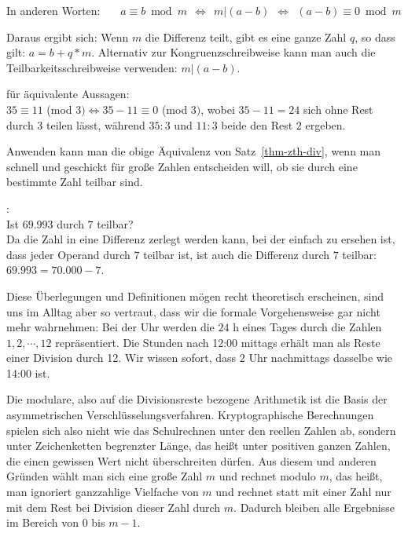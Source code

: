 \begin{refsegment}
\noindent In anderen Worten:~~~
$ a \equiv b \bmod{m}   ~~ \Longleftrightarrow ~~
  m | (a-b)             ~~ \Longleftrightarrow ~~
  (a-b) \equiv 0 \bmod{m} $


Daraus ergibt sich: Wenn $m$ die Differenz teilt, gibt es eine ganze Zahl $q$, so
dass gilt: $a = b + q*m$.
Alternativ zur Kongruenzschreibweise kann man auch die Teilbarkeitsschreibweise
verwenden: $m | (a - b)$.\\

\begin{example}{ für äquivalente Aussagen:}\\
$35 \equiv 11$ (mod $3) \Longleftrightarrow  35 - 11 \equiv 0$ (mod $3)$,
wobei $35 - 11 = 24$ sich ohne Rest durch $3$ teilen lässt, während $35:3$ und
$11:3$ beide den Rest $2$ ergeben.
\end{example}


Anwenden kann man die obige Äquivalenz von Satz~\ref{thm-zth-div}, wenn man schnell
und geschickt für große Zahlen entscheiden will, ob sie durch eine bestimmte
Zahl teilbar sind.

\begin{example}{:}\\
Ist $69.993$ durch $7$ teilbar?\\
Da die Zahl in eine Differenz zerlegt werden kann, bei der einfach zu ersehen
ist, dass jeder Operand durch $7$ teilbar ist, ist auch die Differenz durch $7$
teilbar: $69.993 = 70.000 - 7$.\\
\end{example}

Diese Überlegungen und Definitionen mögen recht theoretisch erscheinen, sind
uns im Alltag aber so vertraut, dass wir die formale Vorgehensweise gar nicht
mehr wahrnehmen: Bei der Uhr werden die $24$ h eines Tages durch die Zahlen
$1, 2, \cdots, 12$ repräsentiert. Die Stunden nach 12:00 mittags erhält man als
Reste einer Division durch 12. Wir wissen sofort, dass $2$ Uhr nachmittags
dasselbe wie 14:00 ist.

Die \glqq modulare\grqq, also auf die Divisionsreste bezogene Arithmetik ist die
Basis der asymmetrischen Verschlüsselungsverfahren.
Kryptographische Berechnungen spielen sich also nicht wie das Schulrechnen
unter den reellen Zahlen ab, sondern unter Zeichenketten begrenzter Länge,
das heißt unter positiven ganzen Zahlen, die einen gewissen Wert nicht
überschreiten dürfen.
Aus diesem und anderen Gründen wählt man sich eine große Zahl $m$ und \glqq rechnet
modulo $m$\grqq, das heißt, man ignoriert ganzzahlige Vielfache von $m$ und rechnet
statt mit einer Zahl nur mit dem Rest bei Division dieser Zahl durch $m$.
Dadurch bleiben alle Ergebnisse im Bereich von $0$ bis $m-1$.



\end{refsegment}
